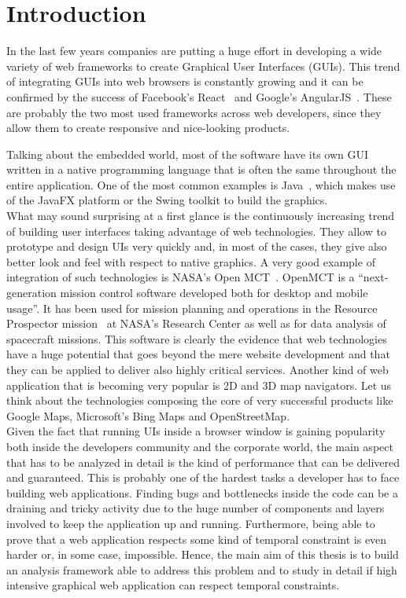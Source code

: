 ﻿%
\chapter{Introduction} \label{cha:intro}

In the last few years companies are putting a huge effort in developing a wide
variety of web frameworks to create Graphical User Interfaces (GUIs). This trend
of integrating GUIs into web browsers is constantly growing and it can be
confirmed by the success of Facebook's React~\cite{fbreact} and Google's
AngularJS~\cite{angularjs}. These are probably the two most used frameworks across
web developers, since they allow them to create responsive and nice-looking products.

Talking about the embedded world, most of the software have its own GUI
written in a native programming language that is often the same throughout the entire application.
One of the most common examples is Java~\cite{gosling1995java}, which makes use of the JavaFX
platform or the Swing toolkit to build the graphics.\\
What may sound surprising at a first glance is the continuously increasing trend of 
building user interfaces taking advantage of web technologies.
They allow to prototype and design UIs very quickly and, in
most of the cases, they give also better look and feel with respect to native graphics.
A very good example of integration of such technologies is NASA's Open MCT~\cite{openmct}.
OpenMCT is a ``next-generation mission control software developed both for desktop and mobile
usage''. It has been used for mission planning and operations in the Resource
Prospector mission~\cite{andrews2014introducing} at NASA's Research Center as well as for
data analysis of spacecraft missions. This software is clearly the evidence that web
technologies have a huge potential that goes beyond the mere website development and that they 
can be applied to deliver also highly critical services.
Another kind of web application that is becoming very popular is 2D and 3D map navigators.
Let us think about the technologies composing the core of very successful products like
Google Maps, Microsoft's Bing Maps and OpenStreetMap.\\
Given the fact that running UIs inside a browser window is gaining popularity both inside the
developers community and the corporate world, the main aspect that has to be analyzed
in detail is the kind of performance that can be delivered and guaranteed. This is probably one of
the hardest tasks a developer has to face building web applications. Finding bugs
and bottlenecks inside the code can be a draining and tricky activity due to the huge number
of components and layers involved to keep the application up and running. Furthermore,
being able to prove that a web application respects some kind of temporal constraint
is even harder or, in some case, impossible. Hence, the main aim of this thesis is
to build an analysis framework able to address this problem and to study in detail
if high intensive graphical web application can respect temporal constraints.

